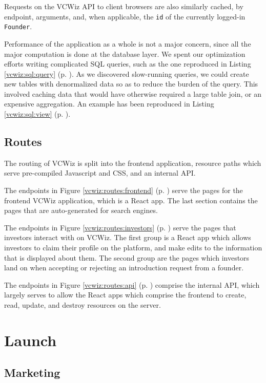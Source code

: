 Requests on the VCWiz API to client browsers are also similarly cached, by endpoint, arguments, and, when applicable, the \texttt{id} of the currently logged-in \texttt{Founder}.

Performance of the application as a whole is not a major concern, since all the major computation is done at the database layer. We spent our optimization efforts writing complicated SQL queries, such as the one reproduced in Listing \ref{vcwiz:sql:query} (p. \pageref{vcwiz:sql:query}). As we discovered slow-running queries, we could create new tables with denormalized data so as to reduce the burden of the query. This involved caching data that would have otherwise required a large table join, or an expensive aggregation. An example has been reproduced in Listing \ref{vcwiz:sql:view} (p. \pageref{vcwiz:sql:view}).

\subsection{Routes}

The routing of VCWiz is split into the frontend application, resource paths which serve pre-compiled Javascript and CSS, and an internal API.

The endpoints in Figure \ref{vcwiz:routes:frontend} (p. \pageref{vcwiz:routes:frontend}) serve the pages for the frontend VCWiz application, which is a React app. The last section contains the pages that are auto-generated for search engines.

The endpoints in Figure \ref{vcwiz:routes:investors} (p. \pageref{vcwiz:routes:investors}) serve the pages that investors interact with on VCWiz. The first group is a React app which allows investors to claim their profile on the platform, and make edits to the information that is displayed about them. The second group are the pages which investors land on when accepting or rejecting an introduction request from a founder.

The endpoints in Figure \ref{vcwiz:routes:api} (p. \pageref{vcwiz:routes:api}) comprise the internal API, which largely serves to allow the React apps which comprise the frontend to create, read, update, and destroy resources on the server.

\section{Launch}

\subsection{Marketing}


